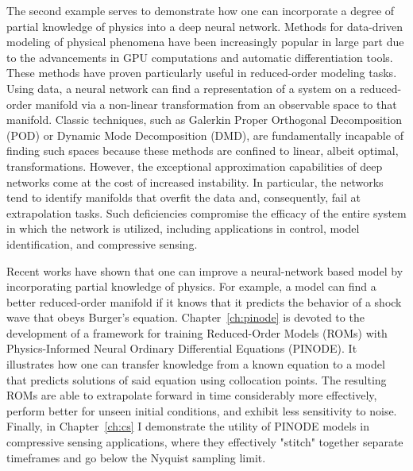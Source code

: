 The second example serves to demonstrate how one can incorporate a degree of partial knowledge of physics into a deep neural network. Methods for data-driven modeling of physical phenomena have been increasingly popular in large part due to the advancements in GPU computations and automatic differentiation tools. These methods have proven particularly useful in reduced-order modeling tasks.  Using data, a neural network can find a representation of a system on a reduced-order manifold via a non-linear transformation from an observable space to that manifold. Classic techniques, such as Galerkin Proper Orthogonal Decomposition (POD) or Dynamic Mode Decomposition (DMD), are fundamentally incapable of finding such spaces because these methods are confined to linear, albeit optimal, transformations. However, the exceptional approximation capabilities of deep networks come at the cost of increased instability. In particular, the networks tend to identify manifolds that overfit the data and, consequently, fail at extrapolation tasks. Such deficiencies compromise the efficacy of the entire system in which the network is utilized, including applications in control, model identification, and compressive sensing.

Recent works have shown that one can improve a neural-network based model by incorporating partial knowledge of physics. For example, a model can find a better reduced-order manifold if it knows that it predicts the behavior of a shock wave that obeys Burger's equation. Chapter~\ref{ch:pinode} is devoted to the development of a framework for training Reduced-Order Models (ROMs) with Physics-Informed Neural Ordinary Differential Equations (PINODE). It illustrates how one can transfer knowledge from a known equation to a model that predicts solutions of said equation using collocation points.  The resulting ROMs are able to extrapolate forward in time considerably more effectively,  perform better for unseen initial conditions, and exhibit less sensitivity to noise. Finally, in Chapter~\ref{ch:cs} I demonstrate the utility of PINODE models in compressive sensing applications, where they effectively "stitch" together separate timeframes and go below the Nyquist sampling limit.

